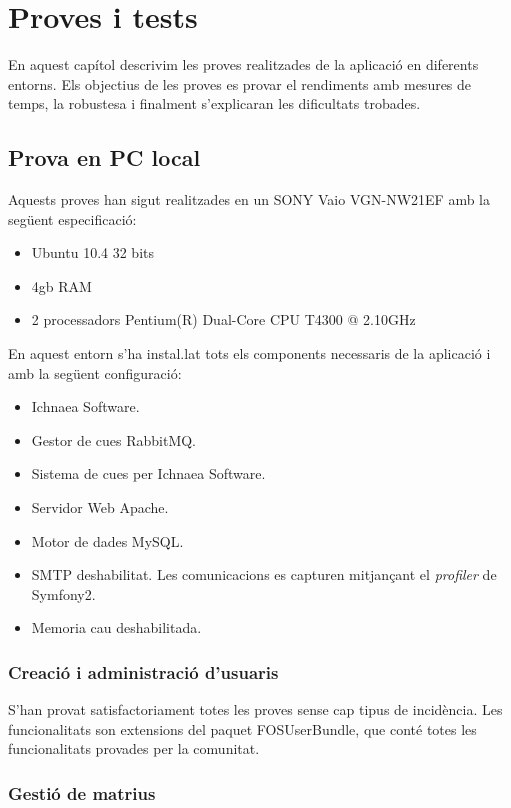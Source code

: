 \chapter{Proves i tests}
\label{cha:tests}
En aquest capítol descrivim les proves realitzades de la aplicació en diferents entorns. Els objectius de les proves es provar el rendiments amb mesures de temps, la robustesa i finalment s'explicaran les dificultats trobades.

\section{Prova en PC local}
Aquests proves han sigut realitzades en un SONY Vaio VGN-NW21EF amb la següent especificaci\'{o}:
\begin{itemize}
\item Ubuntu 10.4 32 bits
\item 4gb RAM
\item 2 processadors Pentium(R) Dual-Core CPU T4300  @ 2.10GHz
\end{itemize}
En aquest entorn s'ha instal.lat tots els components necessaris de la aplicaci\'{o} i amb la següent configuraci\'{o}:
\begin{itemize}
\item Ichnaea Software.
\item Gestor de cues RabbitMQ.
\item Sistema de cues per Ichnaea Software.
\item Servidor Web Apache.
\item Motor de dades MySQL.
\item SMTP deshabilitat. Les comunicacions es capturen mitjançant el \textit{profiler} de Symfony2.
\item Memoria cau deshabilitada.
\end{itemize}

\subsection*{Creaci\'{o} i administraci\'{o} d'usuaris}
S'han provat satisfactoriament totes les proves sense cap tipus de incid\`{e}ncia. Les funcionalitats son extensions del paquet FOSUserBundle, que cont\'{e} totes les funcionalitats provades per la comunitat.\cite{fosuserbundle}

\subsection*{Gesti\'{o} de matrius}

